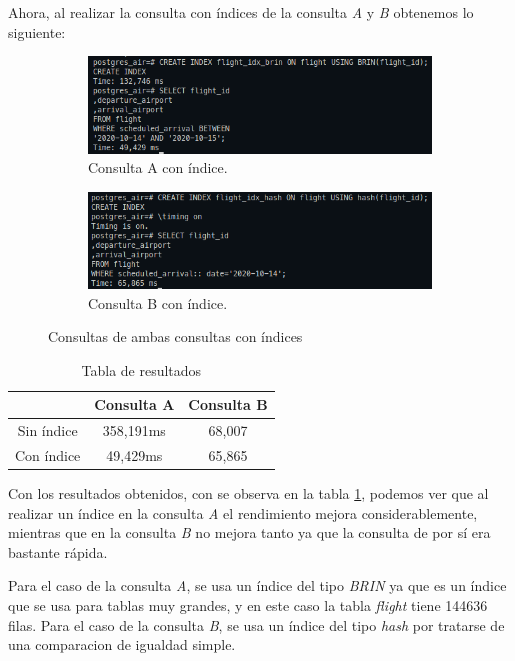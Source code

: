 \documentclass[11pt]{report}
\begin{document}
Ahora, al realizar la consulta con índices de la consulta \emph{A} y \emph{B} obtenemos lo siguiente:
\begin{figure}[H]
  \begin{subfigure}{0.5\textwidth}
    \centering
    \includegraphics[scale=0.45]{img/consulta_A_con_indice.png}
    \caption{Consulta A con índice.}
  \end{subfigure}%
  \begin{subfigure}{0.5\textwidth}
    \centering
    \includegraphics[scale=0.45]{img/consulta_b_con_indice.png}
    \caption{Consulta B con índice.}
  \end{subfigure}
  \caption{Consultas de ambas consultas con índices}
\end{figure}

\cleardoublepage

\begin{table}[H]
  \centering
  \begin{tabular}{|c|c|c|}
    \hline
    \textbf{}  & \textbf{Consulta A} & \textbf{Consulta B} \\ \hline
    Sin índice & 358,191ms & 68,007 \\ \hline
    Con índice & 49,429ms & 65,865 \\ \hline
  \end{tabular}
  \caption{Tabla de resultados}
  \label{tab:tabla de resultados}
\end{table}

Con los resultados obtenidos, con se observa en la tabla \ref{tab:tabla de resultados},
 podemos ver que al realizar un índice en la consulta \emph{A} el rendimiento
mejora considerablemente, mientras que en la consulta \emph{B} no mejora tanto ya que la consulta de por sí
era bastante rápida.

Para el caso de la consulta \emph{A}, se usa un índice del tipo \emph{BRIN} ya que es un índice que se usa
para tablas muy grandes, y en este caso la tabla \emph{flight} tiene 144636 filas. Para el caso de la consulta
\emph{B}, se usa un índice del tipo \emph{hash} por tratarse de una comparacion de igualdad simple.
\end{document}
